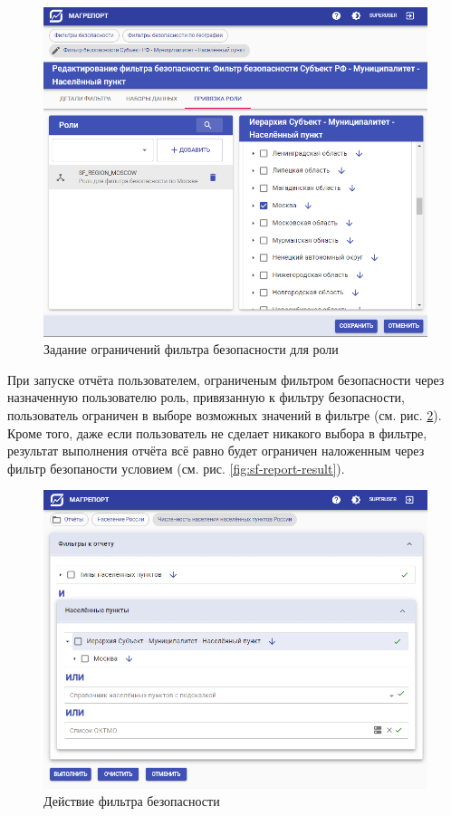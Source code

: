 \documentclass[../user-manual.tex]{subfiles}
\begin{document}
	\begin{figure}[h]
		\centering
		\includegraphics[width=\graphicswidth]{img/15-sf-bind-to-role.png}
		\caption{Задание ограничений фильтра безопасности для роли}
		\label{fig:sf-bind-to-role}
	\end{figure}

	При запуске отчёта пользователем, ограниченым фильтром безопасности через назначенную пользователю роль, привязанную к фильтру безопасности, пользователь ограничен в выборе возможных значений в фильтре (см. рис. \ref{fig:sf-action}). Кроме того, даже если пользователь не сделает никакого выбора в фильтре, результат выполнения отчёта всё равно будет ограничен наложенным через фильтр безопаности условием (см. рис. \ref{fig:sf-report-result}).

	\begin{figure}[h]
		\centering
		\includegraphics[width=\graphicswidth]{img/14-sf-action.png}
		\caption{Действие фильтра безопасности}
		\label{fig:sf-action}
	\end{figure}
\end{document}
